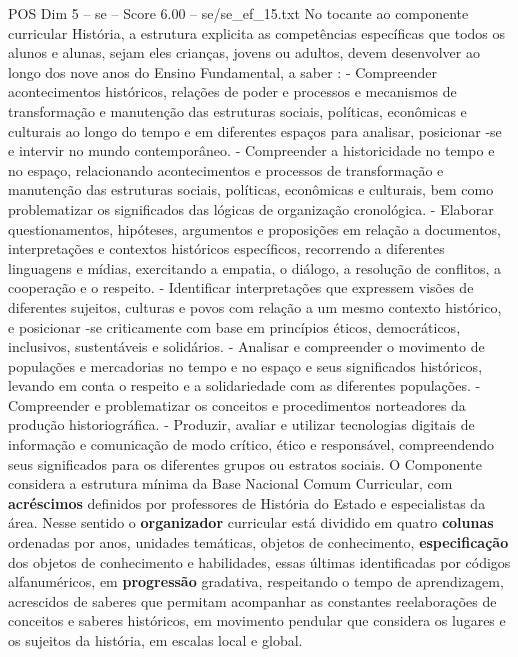 \begin{textsample}{POS Dim 5 – se – Score 6.00 – se/se\_ef\_15.txt}
No tocante ao componente curricular História, a estrutura explicita as competências específicas que todos os alunos e alunas, sejam eles crianças, jovens ou adultos, devem desenvolver ao longo dos nove anos do Ensino Fundamental, a saber : - Compreender acontecimentos históricos, relações de poder e processos e mecanismos de transformação e manutenção das estruturas sociais, políticas, econômicas e culturais ao longo do tempo e em diferentes espaços para analisar, posicionar -se e intervir no mundo contemporâneo. - Compreender a historicidade no tempo e no espaço, relacionando acontecimentos e processos de transformação e manutenção das estruturas sociais, políticas, econômicas e culturais, bem como problematizar os significados das lógicas de organização cronológica. - Elaborar questionamentos, hipóteses, argumentos e proposições em relação a documentos, interpretações e contextos históricos específicos, recorrendo a diferentes linguagens e mídias, exercitando a empatia, o diálogo, a resolução de conflitos, a cooperação e o respeito. - Identificar interpretações que expressem visões de diferentes sujeitos, culturas e povos com relação a um mesmo contexto histórico, e posicionar -se criticamente com base em princípios éticos, democráticos, inclusivos, sustentáveis e solidários. - Analisar e compreender o movimento de populações e mercadorias no tempo e no espaço e seus significados históricos, levando em conta o respeito e a solidariedade com as diferentes populações. - Compreender e problematizar os conceitos e procedimentos norteadores da produção historiográfica. - Produzir, avaliar e utilizar tecnologias digitais de informação e comunicação de modo crítico, ético e responsável, compreendendo seus significados para os diferentes grupos ou estratos sociais.
O Componente considera a estrutura mínima da Base Nacional Comum Curricular, com \textbf{acréscimos} definidos por professores de História do Estado e especialistas da área.
Nesse sentido o \textbf{organizador} curricular está dividido em quatro \textbf{colunas} ordenadas por anos, unidades temáticas, objetos de conhecimento, \textbf{especificação} dos objetos de conhecimento e habilidades, essas últimas identificadas por códigos alfanuméricos, em \textbf{progressão} gradativa, respeitando o tempo de aprendizagem, acrescidos de saberes que permitam acompanhar as constantes reelaborações de conceitos e saberes históricos, em movimento pendular que considera os lugares e os sujeitos da história, em escalas local e global.

\end{textsample}
